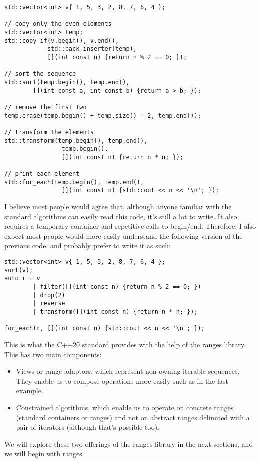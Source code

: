 \begin{lstlisting}[style=styleCXX]
std::vector<int> v{ 1, 5, 3, 2, 8, 7, 6, 4 };

// copy only the even elements
std::vector<int> temp;
std::copy_if(v.begin(), v.end(),
			std::back_inserter(temp),
			[](int const n) {return n % 2 == 0; });
			
// sort the sequence
std::sort(temp.begin(), temp.end(),
		[](int const a, int const b) {return a > b; });
		
// remove the first two
temp.erase(temp.begin() + temp.size() - 2, temp.end());

// transform the elements
std::transform(temp.begin(), temp.end(),
				temp.begin(),
				[](int const n) {return n * n; });

// print each element
std::for_each(temp.begin(), temp.end(),
				[](int const n) {std::cout << n << '\n'; });
\end{lstlisting}

I believe most people would agree that, although anyone familiar with the standard algorithms can easily read this code, it’s still a lot to write. It also requires a temporary container and repetitive calls to begin/end. Therefore, I also expect most people would more easily understand the following version of the previous code, and probably prefer to write it as such:

\begin{lstlisting}[style=styleCXX]
std::vector<int> v{ 1, 5, 3, 2, 8, 7, 6, 4 };
sort(v);
auto r = v
		| filter([](int const n) {return n % 2 == 0; })
		| drop(2)
		| reverse
		| transform([](int const n) {return n * n; });
		
for_each(r, [](int const n) {std::cout << n << '\n'; });
\end{lstlisting}

This is what the C++20 standard provides with the help of the ranges library. This has two main components:

\begin{itemize}
\item
Views or range adaptors, which represent non-owning iterable sequences. They enable us to compose operations more easily such as in the last example.

\item
Constrained algorithms, which enable us to operate on concrete ranges (standard containers or ranges) and not on abstract ranges delimited with a pair of iterators (although that’s possible too).
\end{itemize}

We will explore these two offerings of the ranges library in the next sections, and we will begin with ranges.

